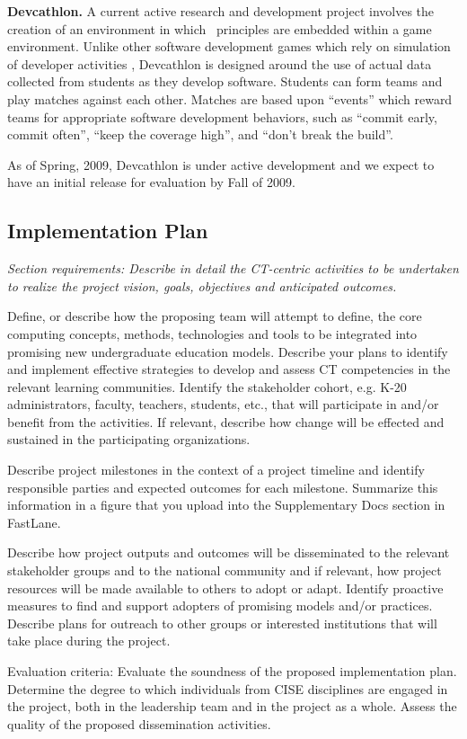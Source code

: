 {\bf Devcathlon.} A current active research and development project involves
the creation of an environment in which \eCT\ principles are embedded within
a game environment.  Unlike other software development games which rely on
simulation of developer activities \cite{simSE}, Devcathlon is designed
around the use of actual data collected from students as they develop
software.  Students can form teams and play matches against each other.
Matches are based upon ``events'' which reward teams for appropriate
software development behaviors, such as ``commit early, commit often'',
``keep the coverage high'', and ``don't break the build''.

As of Spring, 2009, Devcathlon is under active development and we expect to
have an initial release for evaluation by Fall of 2009.


\subsection{Implementation Plan}
\label{sec:implementation}

{\em Section requirements: Describe in detail the CT-centric activities to
be undertaken to realize the project vision, goals, objectives and
anticipated outcomes.

Define, or describe how the proposing team will attempt to define, the core
computing concepts, methods, technologies and tools to be integrated into
promising new undergraduate education models.  Describe your plans to
identify and implement effective strategies to develop and assess CT
competencies in the relevant learning communities.  Identify the
stakeholder cohort, e.g. K-20 administrators, faculty, teachers, students,
etc., that will participate in and/or benefit from the activities. If
relevant, describe how change will be effected and sustained in the
participating organizations.

Describe project milestones in the context of a project timeline and
identify responsible parties and expected outcomes for each milestone.
Summarize this information in a figure that you upload into the
Supplementary Docs section in FastLane.

Describe how project outputs and outcomes will be disseminated to the
relevant stakeholder groups and to the national community and if relevant,
how project resources will be made available to others to adopt or
adapt. Identify proactive measures to find and support adopters of
promising models and/or practices. Describe plans for outreach to other
groups or interested institutions that will take place during the project.

Evaluation criteria: Evaluate the soundness of the proposed implementation
plan.  Determine the degree to which individuals from CISE disciplines are
engaged in the project, both in the leadership team and in the project as a
whole.  Assess the quality of the proposed dissemination activities.
}
\bigskip

